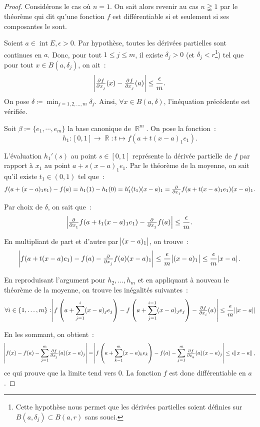 \documentclass{article}
\DeclareMathOperator{\intr}{int}
\DeclareMathOperator{\R}{\mathbb R}
\theoremstyle{definition}
\theoremstyle{remark}
\begin{document}
		\begin{proof} Considérons le cas où $n=1$. On sait alors revenir au cas $n \gneqq 1$ par le théorème qui dit qu'une fonction $f$ est différentiable si
		et seulement si ses composantes le sont.

		Soient $a \in \intr E, \epsilon > 0$. Par hypothèse, toutes les dérivées partielles sont continues en $a$. Donc, pour tout $1 \leq j \leq m$, il existe
		$\delta_j > 0$ (et $\delta_j < r$\footnote{Cette hypothèse nous permet que les dérivées partielles soient définies sur $B(a, \delta_j) \subset B(a, r)$
		sans souci.}) tel que pour tout $x \in B(a, \delta_j)$, on ait~:
		\[\abs{\pd f{x_j}(x) - \pd f{x_j}(a)} \leq \frac \epsilon m.\]
		On pose $\delta \coloneqq \min_{j = 1, 2, \dotsc, m}\delta_j$. Ainsi, $\forall x \in B(a, \delta)$, l'inéquation précédente est vérifiée.

		Soit $\beta \coloneqq \{e_1, \dotsb, e_m\}$ la base canonique de $\R^m$. On pose la fonction~:
		\[h_1 : [0, 1] \to \R : t \mapsto f(a + t(x-a)_1e_1).\]

		L'évaluation $h_1'(s)$ au point $s \in [0, 1]$ représente la dérivée partielle de $f$ par rapport à $x_1$ au point $a + s(x-a)_1e_1$. Par le théorème de
		la moyenne, on sait qu'il existe $t_1 \in (0, 1)$ tel que~:
		\[f(a + (x-a)_1e_1) - f(a) = h_1(1) - h_1(0) = h_1'(t_1)(x-a)_1 = \pd {}{x_1}f(a + t(x-a)_1e_1)(x-a)_1.\]

		Par choix de $\delta$, on sait que~:
		\[\abs{\pd {}{x_1}f(a + t_1(x-a)_1e_1) - \pd {}{x_1}f(a)} \leq \frac \epsilon m.\]

		En multipliant de part et d'autre par $\abs {(x-a)_1}$, on trouve~:
		\[\abs {f(a + t(x-a)e_1) - f(a) - \pd {}{x_j}f(a)(x-a)_1} \leq \frac \epsilon m\abs {(x-a)_1} \leq \frac \epsilon m \abs {x-a}.\]

		En reproduisant l'argument pour $h_2, \dotsc, h_m$ et en appliquant à nouveau le théorème de la moyenne, on trouve les inégalités suivantes~:
		\[\forall i \in \{1, \dotsc, m\} : \abs{f\left(a+ \sum_{j=1}^i(x-a)_je_j\right) - f\left(a + \sum_{j=1}^{i-1}(x-a)_je_j\right) - \pd f{x_i}(a)}
		\leq \frac \epsilon m \norm{x-a}\]

		En les sommant, on obtient~:
		\[\abs{f(x)-f(a) - \sum_{j=1}^m\pd f{x_j}(a)(x-a)_j} = \abs {f\left(a + \sum_{k=1}^m(x-a)_ke_k\right)-f(a) - \sum_{j=1}^m\pd f{x_k}(a)(x-a)_j}
		\leq \epsilon\norm{x-a},\]
		ce qui prouve que la limite tend vers 0. La fonction $f$ est donc différentiable en $a$.
		\end{proof}
\end{document}
